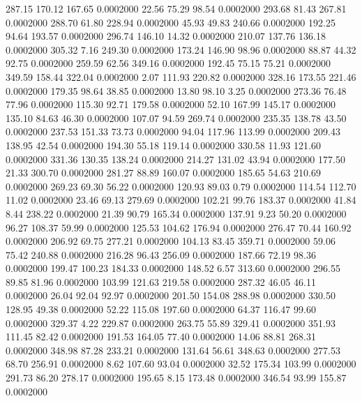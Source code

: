  287.15  170.12  167.65   0.0002000
  22.56   75.29   98.54   0.0002000
 293.68   81.43  267.81   0.0002000
 288.70   61.80  228.94   0.0002000
  45.93   49.83  240.66   0.0002000
 192.25   94.64  193.57   0.0002000
 296.74  146.10   14.32   0.0002000
 210.07  137.76  136.18   0.0002000
 305.32    7.16  249.30   0.0002000
 173.24  146.90   98.96   0.0002000
  88.87   44.32   92.75   0.0002000
 259.59   62.56  349.16   0.0002000
 192.45   75.15   75.21   0.0002000
 349.59  158.44  322.04   0.0002000
   2.07  111.93  220.82   0.0002000
 328.16  173.55  221.46   0.0002000
 179.35   98.64   38.85   0.0002000
  13.80   98.10    3.25   0.0002000
 273.36   76.48   77.96   0.0002000
 115.30   92.71  179.58   0.0002000
  52.10  167.99  145.17   0.0002000
 135.10   84.63   46.30   0.0002000
 107.07   94.59  269.74   0.0002000
 235.35  138.78   43.50   0.0002000
 237.53  151.33   73.73   0.0002000
  94.04  117.96  113.99   0.0002000
 209.43  138.95   42.54   0.0002000
 194.30   55.18  119.14   0.0002000
 330.58   11.93  121.60   0.0002000
 331.36  130.35  138.24   0.0002000
 214.27  131.02   43.94   0.0002000
 177.50   21.33  300.70   0.0002000
 281.27   88.89  160.07   0.0002000
 185.65   54.63  210.69   0.0002000
 269.23   69.30   56.22   0.0002000
 120.93   89.03    0.79   0.0002000
 114.54  112.70   11.02   0.0002000
  23.46   69.13  279.69   0.0002000
 102.21   99.76  183.37   0.0002000
  41.84    8.44  238.22   0.0002000
  21.39   90.79  165.34   0.0002000
 137.91    9.23   50.20   0.0002000
  96.27  108.37   59.99   0.0002000
 125.53  104.62  176.94   0.0002000
 276.47   70.44  160.92   0.0002000
 206.92   69.75  277.21   0.0002000
 104.13   83.45  359.71   0.0002000
  59.06   75.42  240.88   0.0002000
 216.28   96.43  256.09   0.0002000
 187.66   72.19   98.36   0.0002000
 199.47  100.23  184.33   0.0002000
 148.52    6.57  313.60   0.0002000
 296.55   89.85   81.96   0.0002000
 103.99  121.63  219.58   0.0002000
 287.32   46.05   46.11   0.0002000
  26.04   92.04   92.97   0.0002000
 201.50  154.08  288.98   0.0002000
 330.50  128.95   49.38   0.0002000
  52.22  115.08  197.60   0.0002000
  64.37  116.47   99.60   0.0002000
 329.37    4.22  229.87   0.0002000
 263.75   55.89  329.41   0.0002000
 351.93  111.45   82.42   0.0002000
 191.53  164.05   77.40   0.0002000
  14.06   88.81  268.31   0.0002000
 348.98   87.28  233.21   0.0002000
 131.64   56.61  348.63   0.0002000
 277.53   68.70  256.91   0.0002000
   8.62  107.60   93.04   0.0002000
  32.52  175.34  103.99   0.0002000
 291.73   86.20  278.17   0.0002000
 195.65    8.15  173.48   0.0002000
 346.54   93.99  155.87   0.0002000

